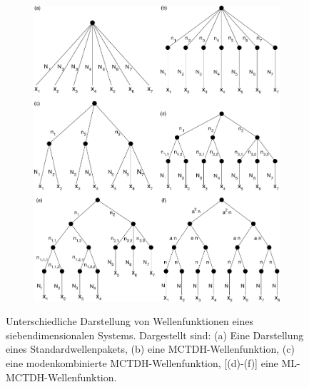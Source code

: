 \begin{figure}
    \centering
    
    \captionsetup[subfigure]{position=top, labelfont=bf,textfont=normalfont,singlelinecheck=off,justification=raggedright,labelformat=empty}
    \begin{subfigure}{\textwidth}
        \caption{}\label{fig:a}
        
    \end{subfigure}
    \begin{subfigure}{\textwidth}
        \caption{}\label{fig:b}
    \end{subfigure}
    \begin{subfigure}{\textwidth}
        \caption{}\label{fig:c}
    \end{subfigure}
    \begin{subfigure}{\textwidth}
        \caption{}\label{fig:d}
    \end{subfigure}
    \begin{subfigure}{\textwidth}
        \caption{}\label{fig:e}
    \end{subfigure}
    \begin{subfigure}{\textwidth}
        \caption{}\label{fig:f}
        \vspace*{-4cm}\includegraphics[width=\textwidth]{figures/treeDiagramms}
    \end{subfigure}
    \caption{Unterschiedliche Darstellung von Wellenfunktionen eines siebendimensionalen Systems. Dargestellt sind: (a) Eine Darstellung eines Standardwellenpakets,
      (b) eine MCTDH-Wellenfunktion, (c) eine modenkombinierte MCTDH-Wellenfunktion, [(d)-(f)] eine ML-MCTDH-Wellenfunktion.}\label{fig:tree}

\end{figure}

